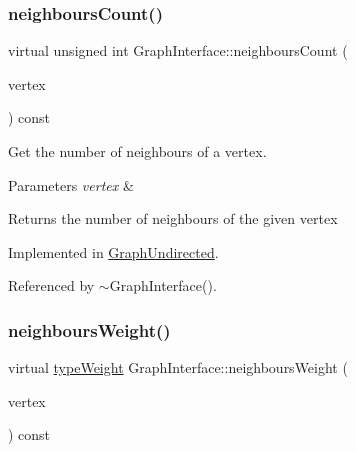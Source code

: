 \subsubsection{\texorpdfstring{neighbours\+Count()}{neighboursCount()}}
{\footnotesize\ttfamily virtual unsigned int Graph\+Interface\+::neighbours\+Count (\begin{DoxyParamCaption}\item[{const \hyperlink{edge_8h_a5fbd20c46956d479cb10afc9855223f6}{type\+Vertex} \&}]{vertex }\end{DoxyParamCaption}) const\hspace{0.3cm}{\ttfamily [pure virtual]}}



Get the number of neighbours of a vertex. 


\begin{DoxyParams}{Parameters}
{\em vertex} & \\
\hline
\end{DoxyParams}
\begin{DoxyReturn}{Returns}
the number of neighbours of the given vertex 
\end{DoxyReturn}


Implemented in \hyperlink{classGraphUndirected_a6377b3a1a0d05fa1f96abb6e4b4b8792}{Graph\+Undirected}.



Referenced by $\sim$\+Graph\+Interface().

\mbox{\label{classGraphInterface_a62e1ed1899155eb63cf7ee82970cd415}} 
\subsubsection{\texorpdfstring{neighbours\+Weight()}{neighboursWeight()}}
{\footnotesize\ttfamily virtual \hyperlink{edge_8h_a2e7ea3be891ac8b52f749ec73fee6dd2}{type\+Weight} Graph\+Interface\+::neighbours\+Weight (\begin{DoxyParamCaption}\item[{const \hyperlink{edge_8h_a5fbd20c46956d479cb10afc9855223f6}{type\+Vertex} \&}]{vertex }\end{DoxyParamCaption}) const\hspace{0.3cm}{\ttfamily [pure virtual]}}



